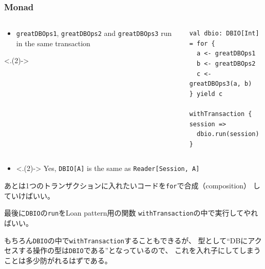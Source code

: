\begin{frame}[fragile]
  \frametitle{Monad}

  \begin{columns}
    \begin{column}{0.6\textwidth}
      \begin{itemize}
         \item \lstinline|greatDBOps1|, \lstinline|greatDBOps2| and \lstinline|greatDBOps3|
         run in the same transaction
      \end{itemize}

      \uncover<.(2)->{%
      }
    \end{column}
    \begin{column}{0.4\textwidth}
\begin{lstlisting}[style=scala]
val dbio: DBIO[Int] = for {
  a <- greatDBOps1
  b <- greatDBOps2
  c <- greatDBOps3(a, b)
} yield c

withTransaction { session =>
  dbio.run(session)
}
\end{lstlisting}
    \end{column}
  \end{columns}

  \pause
  \begin{itemize}
    \item<.(2)-> Yes, \lstinline|DBIO[A]| is the same as \lstinline|Reader[Session, A]|
  \end{itemize}

  \begin{notes}
    \item あとは1つのトランザクションに入れたいコードを\lstinline|for|で合成（composition）
    していけばいい。

    \item 最後に\lstinline|DBIO|の\lstinline|run|をLoan pattern用の関数
    \lstinline|withTransaction|の中で実行してやればいい。

    \item もちろん\lstinline|DBIO|の中で\lstinline|withTransaction|することもできるが、
    型として``DBにアクセスする操作の型は\lstinline|DBIO|である''となっているので、
    これを入れ子にしてしまうことは多少防がれるはずである。


\end{notes}
\end{frame}
